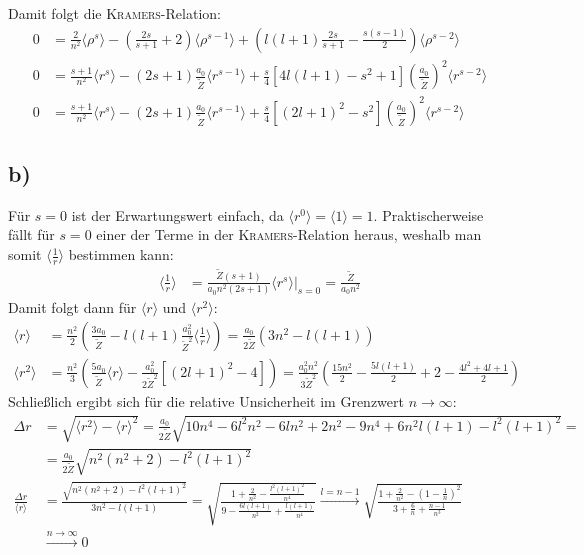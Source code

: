 \documentclass[a4paper,12pt]{article}
\newcommand{\bra}{}
\newcommand{\kla}{}
\newcommand{\klam}{}
\begin{document}
Damit folgt die \textsc{Kramers}-Relation:
\begin{align*}
0&=\frac{2}{n^2}\bra\langle {\rho^s}\rangle-\kla\left( {\frac{2s}{s+1}+2} \right)\bra\langle {\rho^{s-1}}\rangle+\kla\left( {l(l+1)\frac{2s}{s+1}-\frac{s(s-1)}{2}} \right)\bra\langle {\rho^{s-2}}\rangle\\
0&=\frac{s+1}{n^2}\bra\langle {r^s}\rangle-(2s+1)\frac{a_0}{\tilde{Z}}\bra\langle {r^{s-1}}\rangle+\frac{s}{4}\klam\left[ {4l(l+1)-s^2+1} \right]\kla\left( {\frac{a_0}{\tilde{Z}}} \right)^2\bra\langle {r^{s-2}}\rangle\\
0&=\frac{s+1}{n^2}\bra\langle {r^s}\rangle-(2s+1)\frac{a_0}{\tilde{Z}}\bra\langle {r^{s-1}}\rangle+\frac{s}{4}\klam\left[ {(2l+1)^2-s^2} \right]\kla\left( {\frac{a_0}{\tilde{Z}}} \right)^2\bra\langle {r^{s-2}}\rangle
\end{align*}
\subsection*{b)}
Für $s=0$ ist der Erwartungswert einfach, da $\bra\langle {r^0}\rangle=\bra\langle {1}\rangle=1$. Praktischerweise fällt für $s=0$ einer der Terme in der \textsc{Kramers}-Relation heraus, weshalb man somit $\bra\langle {\frac{1}{r}}\rangle$ bestimmen kann:
\begin{align*}
\bra\langle {\frac{1}{r}}\rangle&=\frac{\tilde{Z}(s+1)}{a_0n^2(2s+1)}\bra\langle {r^s}\rangle\Big\vert_{s=0}=\frac{\tilde{Z}}{a_0n^2}
\end{align*}
Damit folgt dann für $\bra\langle {r}\rangle$ und $\bra\langle {r^2}\rangle$:
\begin{align*}
\bra\langle {r}\rangle&=\frac{n^2}{2}\kla\left( {\frac{3a_0}{\tilde{Z}}-l(l+1)\frac{a_0^2}{\tilde{Z}^2}\bra\langle {\frac{1}{r}}\rangle} \right)=\frac{a_0}{2\tilde{Z}}\kla\left( {3n^2-l(l+1)} \right)\\
\bra\langle {r^2}\rangle&=\frac{n^2}{3}\kla\left( {\frac{5a_0}{\tilde{Z}}\bra\langle {r}\rangle-\frac{a_0^2}{2\tilde{Z}^2}\klam\left[ {(2l+1)^2-4} \right]} \right)=\frac{a_0^2n^2}{3\tilde{Z}^2}\kla\left( {\frac{15n^2}{2}-\frac{5l(l+1)}{2}+2-\frac{4l^2+4l+1}{2}} \right)
\end{align*}
Schließlich ergibt sich für die relative Unsicherheit im Grenzwert $n\rightarrow\infty$:
\begin{align*}
\Delta r&=\sqrt{\bra\langle {r^2}\rangle-\bra\langle {r}\rangle^2}=\frac{a_0}{2\tilde{Z}}\sqrt{10n^4-6l^2n^2-6ln^2+2n^2-9n^4+6n^2l(l+1)-l^2(l+1)^2}=\\
&=\frac{a_0}{2\tilde{Z}}\sqrt{n^2(n^2+2)-l^2(l+1)^2}\\
\frac{\Delta r}{\bra\langle {r}\rangle}&=\frac{\sqrt{n^2(n^2+2)-l^2(l+1)^2}}{3n^2-l(l+1)}=\sqrt{\frac{1+\frac{2}{n^2}-\frac{l^2(l+1)^2}{n^4}}{9-\frac{6l(l+1)}{n^2}+\frac{l(l+1)}{n^4}}}\overset{l=n-1}{\longrightarrow}\sqrt{\frac{1+\frac{2}{n^2}-\kla\left( {1-\frac{1}{n}} \right)^2}{3+\frac{6}{n}+\frac{n-1}{n^3}}}\\
&\overset{n\rightarrow\infty}{\longrightarrow}0
\end{align*}
\end{document}
